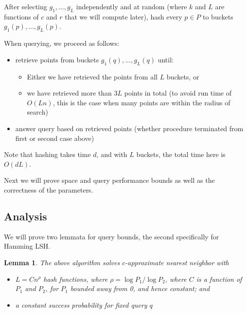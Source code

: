 \documentclass[11pt]{article}
\newtheorem{lemma}[theorem]{Lemma}
\begin{document}
After selecting $g_1, \ldots, g_L$ independently and at random (where $k$ and $L$ are functions of $c$ and $r$ that we will compute later), hash every $p \in P$ to buckets $g_1(p), \ldots, g_L(p)$.

When querying, we proceed as follows:
    \begin{itemize}
        \item retrieve points from buckets $g_1(q), \ldots, g_L(q)$ until:
        \begin{itemize}
            \item Either we have retrieved the points from all $L$ buckets, or
            \item we have retrieved more than $3L$ points in total (to avoid run time of $O(Ln)$, this is the case when many points are within the radius of search) 
        \end{itemize}
        \item answer query based on retrieved points (whether procedure terminated from first or second case above)
    \end{itemize}

Note that hashing takes time $d$, and with $L$ buckets, the total time here is $O(dL)$.

Next we will prove space and query performance bounds as well as the correctness of the parameters.


\subsection{Analysis}

We will prove two lemmata for query bounds, the second specifically for Hamming LSH.

\begin{lemma}
    The above algorithm solves $c$-approximate nearest neighbor with
    \begin{itemize}
        \item $L = Cn^\rho$ hash functions, where $\rho = \log P_1 / \log P_2$, where $C$ is a function of $P_1$ and $P_2$, for $P_1$ bounded away from 0, and hence constant; and
        \item a constant success probability for fixed query $q$
    \end{itemize}
\end{lemma}
\end{document}
